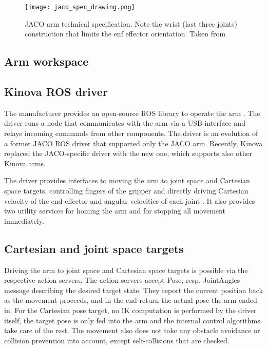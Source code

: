 \documentclass[buriama8_dp.tex]{subfiles}
\begin{document}
\begin{figure}[ht]
  \centering
  \texttt{[image: jaco\_spec\_drawing.png]}
  \caption[JACO blueprint]{JACO arm technical specification. Note the wrist (last three joints) construction that limits the enf effector orientation. Taken from \cite{jaco_spec}}
  \label{fig:jaco_schema}
\end{figure}


\subsection{Arm workspace}

\subsection{Kinova ROS driver}
\label{subsec:kinova_ros}

The manufacturer provides an open-source ROS library to operate the arm \cite{kinova_ros}. The driver runs a node that communicates with the arm via a USB interface and relays incoming commands from other components. The driver is an evolution of a former JACO ROS driver that supported only the JACO arm. Recently, Kinova replaced the JACO-specific driver with the new one, which supports also other Kinova arms.

The driver provides interfaces to moving the arm to joint space and Cartesian space targets, controlling fingers of the gripper and directly driving Cartesian velocity of the end effector and angular velocities of each joint \cite{kinova_ros_api}. It also provides two utility services for homing the arm and for stopping all movement immediately.

\subsection{Cartesian and joint space targets}
\label{subsec:api_cart_action}

Driving the arm to joint space and Cartesian space targets is possible via the respective action servers. The action servers accept Pose, resp. JointAngles message describing the desired target state. They report the current position back as the movement proceeds, and in the end return the actual pose the arm ended in. For the Cartesian pose target, no IK computation is performed by the driver itself, the target pose is only fed into the arm and the internal control algorithms take care of the rest. The movement also does not take any obstacle avoidance or collision prevention into account, except self-collisions that are checked.
\end{document}
